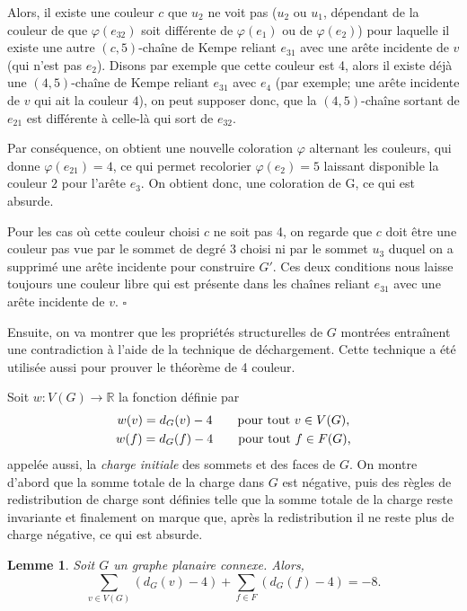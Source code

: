 \documentclass[10pt,a4paper]{article}
\newtheorem{lemme}{Lemme}
\newcommand{\ep}{{\hfill $\square$}}
\begin{document}
Alors, il existe une couleur $c$ que $u_2$ ne voit pas ($u_2$ ou $u_1$, dépendant de la couleur de  que $\varphi(e_{32})$ soit différente de $\varphi(e_1)$ ou de $\varphi(e_2)$)  pour laquelle il existe une autre $(c,5)$-chaîne de Kempe reliant $e_{31}$ avec une arête incidente de $v$ (qui n'est pas $e_2$). Disons par exemple que cette couleur est 4, alors il existe déjà une $(4,5)$-chaîne de Kempe reliant $e_{31}$ avec $e_4$ (par exemple; une arête incidente de $v$ qui ait la couleur $4$), on peut supposer donc, que la $(4,5)$-chaîne sortant de $e_{21}$ est différente à celle-là qui sort de $e_{32}$.

Par conséquence, on obtient une nouvelle coloration $\varphi$ alternant les couleurs, qui donne $\varphi(e_{21}) = 4$, ce qui permet recolorier $\varphi(e_2) = 5$ laissant disponible la couleur $2$ pour l'arête $e_3$. On obtient donc, une coloration de G, ce qui est absurde.

Pour les cas où cette couleur choisi $c$ ne soit pas 4, on regarde que $c$ doit être une couleur pas vue par le sommet de degré 3 choisi ni par le sommet $u_3$ duquel on a supprimé une arête incidente pour construire $G'$. Ces deux conditions nous laisse toujours une couleur libre qui est présente dans les chaînes reliant $e_{31}$ avec une arête incidente de $v$.
\ep


\bigskip
Ensuite, on va montrer que les propriétés structurelles de $G$ montrées entraînent une contradiction à l'aide de la technique de déchargement. Cette technique a été utilisée aussi pour prouver le théorème de 4 couleur. 

Soit $w: V(G) \to \mathbb{R}$  la fonction définie par
 $$
 \gathered
 w(v) = d_G(v) - 4 \qquad \textrm{pour tout $v\in V(G)$,} \\
 w(f) = d_G(f) - 4 \qquad \textrm{pour tout $f\in F(G)$,} 
\endgathered 
$$
appelée aussi, la \emph{charge initiale} des sommets et des faces de $G$. On montre d'abord que la somme totale de la charge dans $G$ est négative, puis des règles de redistribution de charge sont définies telle que la somme totale de la charge reste invariante et finalement on marque que, après la redistribution il ne reste plus de charge négative, ce qui est absurde.

\begin{lemme}
Soit $G$ un graphe planaire connexe. Alors,
$$ \sum_{v \in V(G)} (d_G(v) - 4) + \sum_{f\in F} (d_G(f) -4) = -8.$$
\label{le:charge}
\end{lemme}
\end{document}
